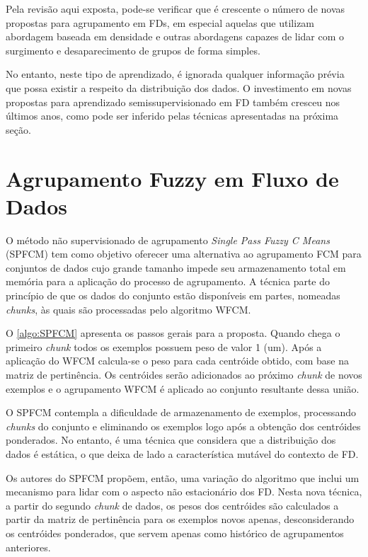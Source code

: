 Pela revisão aqui exposta, pode-se verificar que é crescente o número de novas propostas para agrupamento em FDs, em especial aquelas que utilizam abordagem baseada em densidade e outras abordagens capazes de lidar com o surgimento e desaparecimento de grupos de forma simples.

No entanto, neste tipo de aprendizado, é ignorada qualquer informação prévia que possa existir a respeito da distribuição dos dados. O investimento em novas propostas para aprendizado semissupervisionado em FD também cresceu nos últimos anos, como pode ser inferido pelas técnicas apresentadas na próxima seção.

\section{Agrupamento Fuzzy em Fluxo de Dados}

O método não supervisionado de agrupamento \emph{Single Pass Fuzzy C Means} (SPFCM) \cite{Hore2007b} tem como objetivo oferecer uma alternativa ao agrupamento FCM para conjuntos de dados cujo grande tamanho impede seu armazenamento total em memória para a aplicação do processo de agrupamento. A técnica parte do princípio de que os dados do conjunto estão disponíveis em partes, nomeadas \emph{chunks}, às quais são processadas pelo algoritmo WFCM. 

O \autoref{algo:SPFCM} apresenta os passos gerais para a proposta. Quando chega o primeiro \emph{chunk} todos os exemplos possuem peso de valor 1 (um). Após a aplicação do WFCM calcula-se o peso para cada centróide obtido, com base na matriz de pertinência. Os centróides serão adicionados ao próximo \emph{chunk} de novos exemplos e o agrupamento WFCM é aplicado ao conjunto resultante dessa união.



O SPFCM contempla a dificuldade de armazenamento de exemplos, processando \emph{chunks} do conjunto e eliminando os exemplos logo após a obtenção dos centróides ponderados. No entanto, é uma técnica que considera que a distribuição dos dados é estática, o que deixa de lado a característica mutável do contexto de FD.

Os autores do SPFCM propõem, então, uma variação do algoritmo\cite{Hore2007} que inclui um mecanismo para lidar com o aspecto não estacionário dos FD. Nesta nova técnica, a partir do segundo \emph{chunk} de dados, os pesos dos centróides são calculados a partir da matriz de pertinência para os exemplos novos apenas, desconsiderando os centróides ponderados, que servem apenas como histórico de agrupamentos anteriores.

